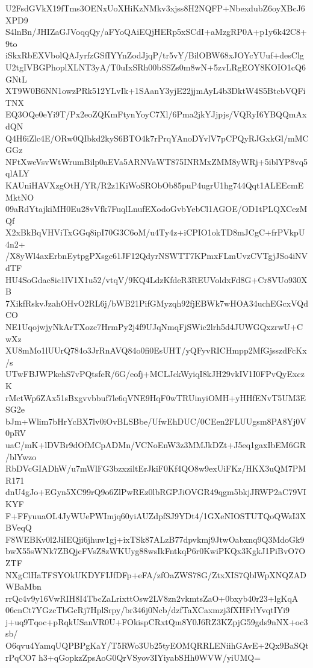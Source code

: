 U2FsdGVkX19fTms3OENxUoXHiKzNMkv3xjss8H2NQFP+NbexdubZ6oyXBcJ6XPD9
S4lnBn/JHIZaGJVoqqQy/aFYoQAiEQjHERp5xSCdI+aMzgRP0A+p1y6k42C8+9to
iSkxRbEXVbolQAJyrfzGSfIYYnZodJjqP/tr5vY/BilOBW68xJOYcYUuf+desClg
U2tgIVBGPhoplXLNT3yA/T0uIxSRh00bSSZs0m8wN+5zvLRgEOY8KOIO1cQ6GNtL
XT9W0B6NN1owzPRk512YLvIk+1SAanY3yjE22jjmAyL4b3DktW4S5BtcbVQFiTNX
EQ3OQe0eYi9T/Px2eoZQKmFtynYoyC7Xl/6Pma2jkYJjpjs/VQRyI6YBQQmAxdQN
Q4H6iZlc4E/ORw0QIbkd2kyS6BTO4k7rPrqYAnoDYvlV7pCPQyRJGxkGl/mMCGGz
NFtXweVsvWtWrumBilp0aEVa5ARNVaWT875INRMxZMM8yWRj+5iblYP8vq5qlALY
KAUniHAVXzgOtH/YR/R2z1KiWoSRObOb85puP4ugrU1hg744Qqt1ALEEcmEMktNO
09aRdYtajkiMH0Eu28vVfk7FuqlLnufEXodoGvbYebCl1AGOE/OD1tPLQXCezMQf
X2xBkBqVHViTxGGq8ipI70G3C6oM/u4Ty4z+iCPIO1okTD8mJCgC+frPVkpU4n2+
/X8yWl4axErbnEytpgPXsgc61JF12QdyrNSWTT7KPmxFLmUvzCVTgjJSo4iNVdTF
HU4SoGdac8ic1lV1X1u52/vtqV/9KQ4LdzKfdeR3REUVoldxFd8G+Cr8VUo930XB
7XikfRskvJzahOHvO2RL6j/bWB21PifGMyzqh92fjEBWk7wHOA34uchEGcxVQdCO
NE1UqojwjyNkArTXozc7HrmPy2j4f9UJqNmqFjSWic2lrh5d4JUWGQxzrwU+CwXz
XU8mMo1lUUrQ784o3JrRnAVQ84o0fi0EsUHT/yQFyvRICHmpp2MfGjsszdFcKx/s
UTwFBJWPkehS7vPQtsfeR/6G/eofj+MCLJckWyiqI8kJH29vkIV1I0FPvQyExczK
rMctWp6ZAx51sBxgvvbbuf7le6qVNE9HqF0wTRUinyiOMH+yHHfENvT5UM3ESG2e
bJm+Wlim7bHrYcBX7lv0iOvBLSBbe/UfwEhDUC/0CEen2FLUUgsm8PA8Yj0V0pRV
uaC/mK+lDVBr9dOfMCpADMn/VCNoEnW3z3MMJkDZt+J5eq1gaxIbEM6GR/blYwzo
RbDVcGIADhW/u7mWlFG3bzxziltErJkiF0Kf4QO8w9exUiFKz/HKX3uQM7PMR171
dnU4gJo+EGyn5XC99rQ9o6ZlPwREz0lbRGPJiOVGR49qgm5bkjJRWP2aC79VIKYF
F+FFyuuaOL4JyWUePWImjq60yiAUZdpfSJ9YDt4/1GXeNIOSTUTQoQWzI3XBVeqQ
F8WEBKv0l2JiIEQji6jhuw1gj+ixTSk87ALzB77dpvkmj9JtwOabxnq9Q3MdoGk9
bwX55sWNk7ZBQjcFVsZ8zWKUyg88wsIkFntkqP6r0KwiPKQx3KgkJ1PiBvO7OZTF
NXgClHaTFSYOkUKDYFIJfDFp+eFA/zfOaZWS78G/ZtxXIS7QblWpXNQZADWBaMbn
rrQc4v9y16VwRIH8I4TbcZaLrixttOsw2LV8zn2vkmtsZaO+0bxyb40r23+lgKqA
06cnCt7YGzcTbGcRj7HplSrpy/br346j0Ncb/dzfTaXCaxmzj3fXHFrlYvqtIYi9
j+uq9Tqoc+pRqkUSanVR0U+FOkispCRxtQm8Y0J6RZ3KZpjG59gds9nNX+oc3sb/
O6qvu4YamqUQPBPgKaY/T5RWo3Ub25tyEOMQRRLENiihGAvE+2Qx9BaSQtrPqCO7
h3+qGopkzZpsAoG0QrVSyov3IYiyabSHh0WVW/yiUMQ=
